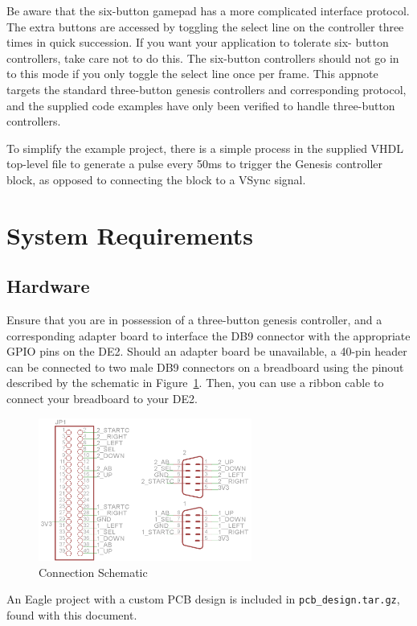 \documentclass{capstonedoc}
\begin{document}
Be aware that the six-button gamepad has a more complicated interface protocol.
The extra buttons are accessed by toggling the select line on the controller
three times in quick succession. If you want your application to tolerate six-
button controllers, take care not to do this. The six-button controllers should
not go in to this mode if you only toggle the select line once per frame.
This appnote targets the standard three-button genesis controllers and 
corresponding protocol, and the supplied code examples have only been verified
to handle three-button controllers.

To simplify the example project, there is a simple process in the supplied VHDL
top-level file to generate a pulse every 50ms to trigger the Genesis controller
block, as opposed to connecting the block to a VSync signal.

\section{System Requirements}

\subsection{Hardware}

Ensure that you are in possession of a three-button genesis controller, and a 
corresponding adapter board to interface the DB9 connector with the appropriate 
GPIO pins on the DE2. Should an adapter board be unavailable, a 40-pin header 
can be connected to two male DB9 connectors on a breadboard using the pinout
described by the schematic in Figure~\ref{fig:schematic}. Then, you can use a
ribbon cable to connect your breadboard to your DE2.

\begin{figure}[h]
  \centering
  \includegraphics[width=7cm]{schematic}
  \caption{Connection Schematic}
  \label{fig:schematic}
\end{figure}

An Eagle project with a custom PCB design is included in
\texttt{pcb\_design.tar.gz}, found with this document.
\end{document}
